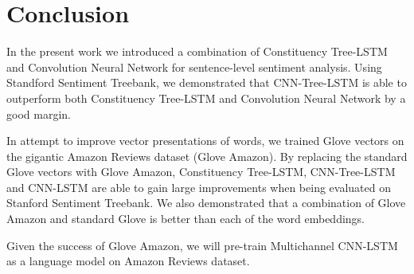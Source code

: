 \section{Conclusion}
In the present work we introduced a combination of Constituency Tree-LSTM and Convolution Neural Network for sentence-level sentiment analysis. 
Using Standford Sentiment Treebank, we demonstrated that CNN-Tree-LSTM is able to outperform both Constituency Tree-LSTM and Convolution Neural Network by a good margin.

In attempt to improve vector presentations of words, we trained Glove vectors on the gigantic Amazon Reviews dataset (Glove Amazon).
By replacing the standard Glove vectors with Glove Amazon, Constituency Tree-LSTM, CNN-Tree-LSTM and CNN-LSTM are able to gain large improvements when being evaluated on Stanford Sentiment Treebank.
We also demonstrated that a combination of Glove Amazon and standard Glove is better than each of the word embeddings.

Given the success of Glove Amazon, we will pre-train Multichannel CNN-LSTM as a language model on Amazon Reviews dataset.

